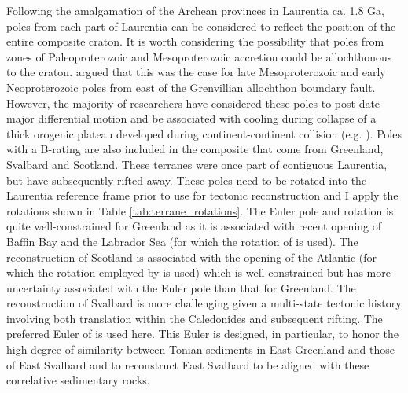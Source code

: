 \documentclass[11pt,letterpaper]{article}
\begin{document}
Following the amalgamation of the Archean provinces in Laurentia ca. 1.8 Ga, poles from each part of Laurentia can be considered to reflect the position of the entire composite craton. It is worth considering the possibility that poles from zones of Paleoproterozoic and Mesoproterozoic accretion could be allochthonous to the craton. \cite{Halls2015b} argued that this was the case for late Mesoproterozoic and early Neoproterozoic poles from east of the Grenvillian allochthon boundary fault. However, the majority of researchers have considered these poles to post-date major differential motion and be associated with cooling during collapse of a thick orogenic plateau developed during continent-continent collision (e.g. \citealp{Brown2012a}). Poles with a B-rating are also included in the composite that come from Greenland, Svalbard and Scotland. These terranes were once part of contiguous Laurentia, but have subsequently rifted away. These poles need to be rotated into the Laurentia reference frame prior to use for tectonic reconstruction and I apply the rotations shown in Table \ref{tab:terrane_rotations}. The Euler pole and rotation is quite well-constrained for Greenland as it is associated with recent opening of Baffin Bay and the Labrador Sea (for which the rotation of \citealp{Roest1989a} is used). The reconstruction of Scotland is associated with the opening of the Atlantic (for which the rotation employed by \citealp{Torsvik2017a} is used) which is well-constrained but has more uncertainty associated with the Euler pole than that for Greenland. The reconstruction of Svalbard is more challenging given a multi-state tectonic history involving both translation within the Caledonides and subsequent rifting. The preferred Euler of \cite{Maloof2006a} is used here. This Euler is designed, in particular, to honor the high degree of similarity between Tonian sediments in East Greenland \citep{Hoffman2012a} and those of East Svalbard \citep{Maloof2006a} and to reconstruct East Svalbard to be aligned with these correlative sedimentary rocks.
\end{document}

